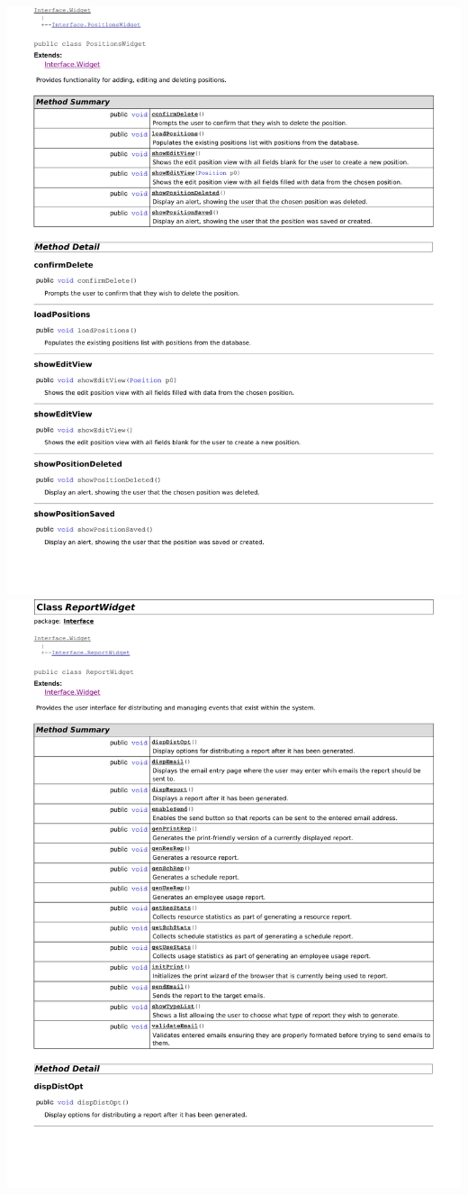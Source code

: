 \documentclass[letterpaper,12pt]{report}
\begin{document}
\newpage
\includegraphics[scale=0.9,trim=20mm 30mm 25mm 25mm]{externals/di6.pdf}
\newpage
\includegraphics[scale=0.9,trim=20mm 30mm 25mm 25mm]{externals/di7.pdf}
\end{document}
